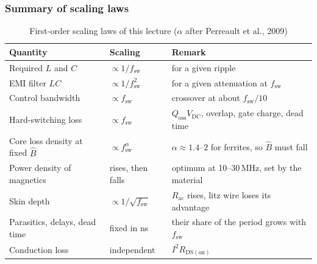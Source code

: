 \begin{frame}
	\frametitle{Summary of scaling laws}
	\begin{table}
		\centering
		\small
		\begin{tabular}{|l|l|>{\raggedright\arraybackslash}p{5.9cm}|}
			\hline
			\textbf{Quantity}                     & \textbf{Scaling}                   & \textbf{Remark}                                                      \\
			\hline
			Required $L$ and $C$                  & $\propto 1/f_\mathrm{sw}$          & for a given ripple                                                   \\
			EMI filter $LC$                       & $\propto 1/f_\mathrm{sw}^2$        & for a given attenuation at $f_\mathrm{sw}$                           \\
			Control bandwidth                     & $\propto f_\mathrm{sw}$            & crossover at about $f_\mathrm{sw}/10$                                \\
			Hard-switching loss                   & $\propto f_\mathrm{sw}$            & $Q_\mathrm{oss}V_\mathrm{DC}$, overlap, gate charge, dead time       \\
			Core loss density at fixed $\hat{B}$  & $\propto f_\mathrm{sw}^{\alpha}$   & $\alpha\approx 1.4$--$2$ for ferrites, so $\hat{B}$ must fall         \\
			Power density of magnetics            & rises, then falls                  & optimum at 10--30\,MHz, set by the material                          \\
			Skin depth                            & $\propto 1/\sqrt{f_\mathrm{sw}}$   & $R_\mathrm{ac}$ rises, litz wire loses its advantage                 \\
			Parasitics, delays, dead time         & fixed in ns                        & their share of the period grows with $f_\mathrm{sw}$                 \\
			Conduction loss                       & independent                        & $I^2R_\mathrm{DS(on)}$                                               \\
			\hline
		\end{tabular}
		\caption{First-order scaling laws of this lecture ($\alpha$ after Perreault et al., 2009)}
	\end{table}
\end{frame}

